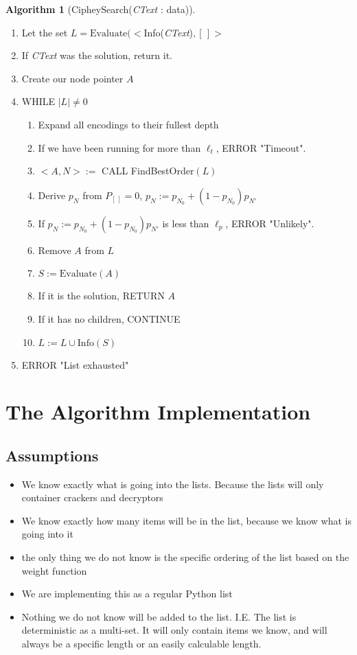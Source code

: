 \documentclass{article}
\theoremstyle{definition}
\newtheorem{algorithm}{Algorithm}
\begin{document}
\begin{algorithm}[CipheySearch(\textit{CText} : data)]\,\\
\begin{enumerate}
\item Let the set $L = \text{Evaluate}(<$Info(\textit{CText})$, [\,]>$
\item If \textit{CText} was the solution, return it.
\item Create our node pointer $A$
\item WHILE $|L| \neq 0$
	\begin{enumerate}
	\item Expand all encodings to their fullest depth
	\item If we have been running for more than $\ell_t$, ERROR "Timeout".
	\item $<A, N> := $ CALL FindBestOrder$(L)$
	\item Derive $p_N$ from $P_{[\,]} = 0$, $p_N := p_{N_0} + (1-p_{N_0})p_{N'}$
	\item If $p_N := p_{N_0} + (1-p_{N_0})p_{N'}$ is less than $\ell_p$, ERROR "Unlikely".
	\item Remove $A$ from $L$
	\item $S := \text{Evaluate}(A)$
	\item If it is the solution, RETURN $A$
	\item If it has no children, CONTINUE
	\item $L := L \cup \text{Info}(S)$
	\end{enumerate}
\item ERROR "List exhausted"
\end{enumerate}
\end{algorithm}

\section{The Algorithm Implementation}

\subsection{Assumptions}

\begin{itemize}
\item We know exactly what is going into the lists. Because the lists will only container crackers and decryptors
\item We know exactly how many items will be in the list, because we know what is going into it
\item the only thing we do not know is the specific ordering of the list based on the weight function
\item We are implementing this as a regular Python list
\item Nothing we do not know will be added to the list. I.E. The list is deterministic as a multi-set. It will only contain items we know, and will always be a specific length or an easily calculable length.
\end{itemize}
\end{document}
